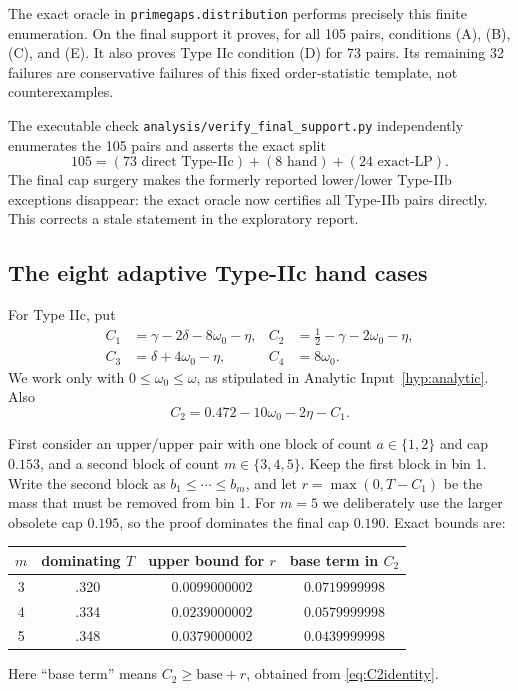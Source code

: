 \documentclass[11pt]{article}
\theoremstyle{definition}
\theoremstyle{remark}
\newcommand{\etaP}{\eta}
\begin{document}
The exact oracle in \texttt{primegaps.distribution} performs precisely this
finite enumeration.  On the final support it proves, for all 105 pairs,
conditions (A), (B), (C), and (E).  It also proves Type IIc condition (D) for
73 pairs.  Its remaining 32 failures are conservative failures of this fixed
order-statistic template, not counterexamples.

The executable check \texttt{analysis/verify\_final\_support.py} independently
enumerates the 105 pairs and asserts the exact split
\[
 105=(73\text{ direct Type-IIc})+(8\text{ hand})
       +(24\text{ exact-LP}).
\]
The final cap surgery makes the formerly reported lower/lower Type-IIb
exceptions disappear: the exact oracle now certifies all Type-IIb pairs
directly.  This corrects a stale statement in the exploratory report.

\subsection{The eight adaptive Type-IIc hand cases}
\label{sec:hand}

For Type IIc, put
\begin{align}
 C_1&=\gamma-2\delta-8\omega_0-\etaP,&
 C_2&=\tfrac12-\gamma-2\omega_0-\etaP,\nonumber\\
 C_3&=\delta+4\omega_0-\etaP,&
 C_4&=8\omega_0.\label{eq:Ccaps}
\end{align}
We work only with \(0\leq\omega_0\leq\omega\), as stipulated in Analytic
Input~\ref{hyp:analytic}.  Also
\begin{equation}
\label{eq:C2identity}
 C_2=0.472-10\omega_0-2\etaP-C_1.
\end{equation}

First consider an upper/upper pair with one block of count \(a\in\{1,2\}\)
and cap \(0.153\), and a second block of count \(m\in\{3,4,5\}\).
Keep the first block in bin 1.  Write the second block as
\(b_1\leq\cdots\leq b_m\), and let
\(r=\max(0,T-C_1)\) be the mass that must be removed from bin 1.  For
\(m=5\) we deliberately use the larger obsolete cap \(0.195\), so the proof
dominates the final cap \(0.190\).  Exact bounds are:
\begin{center}
\begin{tabular}{c|ccc}
\toprule
\(m\)&dominating \(T\)&upper bound for \(r\)&base term in \(C_2\)\\
\midrule
3&.320&\(0.0099000002\)&\(0.0719999998\)\\
4&.334&\(0.0239000002\)&\(0.0579999998\)\\
5&.348&\(0.0379000002\)&\(0.0439999998\)\\
\bottomrule
\end{tabular}
\end{center}
Here ``base term'' means \(C_2\geq\text{base}+r\), obtained from
\eqref{eq:C2identity}.
\end{document}
